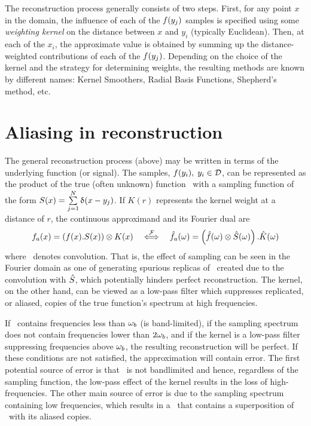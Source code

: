 \documentclass[11pt,fleqn]{book} %
\begin{document}
The reconstruction process generally consists of two steps. First, for any point $x$ in the domain, the influence of each of the $f(y_j)$ samples is specified using some \textit{weighting kernel} on the distance between $x$ and $y_i$ (typically Euclidean). Then, at each of the $x_i$, the approximate value is obtained by summing up the distance-weighted contributions of each of the $f(y_j)$. Depending on the choice of the kernel and the strategy for determining weights, the resulting methods are known by different names: Kernel Smoothers, Radial Basis Functions, Shepherd's method, etc.  

\section{Aliasing in reconstruction}
The general reconstruction process (above) may be written in terms of the underlying function (or signal). The samples, $f(y_i), \; y_i \in \mathcal{D}$, can be represented as the  product of the true (often unknown) function \ifn\ with a sampling function of the form $S(x) = \sum\limits_{j=1}^{N} \updelta(x-y_j)$. 
If $K(r)$ represents the kernel weight at a distance of $r$, the continuous approximand and its Fourier dual are
\begin{equation} \label{eq:recons}
 {\ensuremath{f}}_a(x) = \left(f(x) . S(x) \right) \otimes K(x) \quad \overset{\mathcal{F}}{\Longleftrightarrow}\quad  
 {\ensuremath{\hat{f}}}_a(\omega) = \left(\hat{f}(\omega) \otimes \hat{S}(\omega)\right) . \hat{K}(\omega) 
\end{equation}
where \conv\ denotes convolution. That is, the effect of sampling can be seen in the Fourier domain as one of generating spurious replicas of \IFsym\, created due to the convolution with $\hat{S}$, which potentially hinders perfect reconstruction.   The kernel, on the other hand, can be viewed as a low-pass filter which suppresses replicated, or aliased, copies of the true function's spectrum at high frequencies. 

If \ifn\ contains frequencies less than $\omega_b$ (is band-limited), if the sampling spectrum does not contain frequencies lower than $2\omega_b$, and if the kernel is a low-pass filter suppressing frequencies above $\omega_b$, the resulting reconstruction will be perfect. If these conditions are not satisfied, the approximation will contain error. The first potential source of error is that \ifn\ is not bandlimited and hence, regardless of the sampling function, the low-pass effect of the kernel results in the loss of high-frequencies. The other main source of error is due to the sampling spectrum containing low frequencies, which results in a \FTsym{\appr{\ifsym}}\ that contains a superposition of \IFn\ with its aliased copies.
\end{document}
